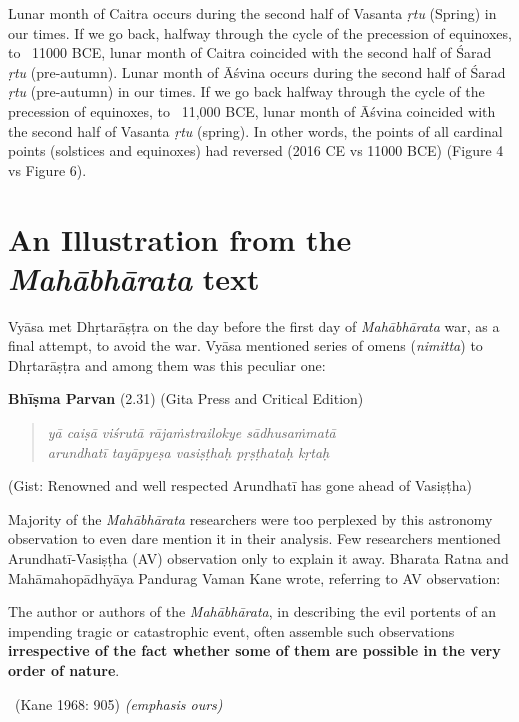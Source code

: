 \begin{enumerate}
Lunar month of Caitra occurs during the second half of Vasanta \textit{ṛtu} (Spring) in our times. If we go back, halfway through the cycle of the precession of equinoxes, to ~11000 BCE, lunar month of Caitra coincided with the second half of Śarad \textit{ṛtu} (pre-autumn). Lunar month of Āśvina occurs during the second half of Śarad \textit{ṛtu} (pre-autumn) in our times. If we go back halfway through the cycle of the precession of equinoxes, to ~11,000 BCE, lunar month of Āśvina coincided with the second half of Vasanta \textit{ṛtu} (spring). In other words, the points of all cardinal points (solstices and equinoxes) had reversed (2016 CE vs 11000 BCE) (Figure 4 vs Figure 6).

\end{enumerate}


\section*{An Illustration from the \textit{Mahābhārata} text}

Vyāsa met Dhṛtarāṣṭra on the day before the first day of \textit{Mahābhārata} war, as a final attempt, to avoid the war. Vyāsa mentioned series of omens (\textit{nimitta}) to Dhṛtarāṣṭra and among them was this peculiar one:

\textbf{Bhīṣma Parvan} (2.31) (Gita Press and Critical Edition)

\begin{verse}
\textit{yā caiṣā viśrutā rājaṁstrailokye sādhusaṁmatā }\\\textit{arundhatī tayāpyeṣa vasiṣṭhaḥ pṛṣṭhataḥ kṛtaḥ }
\end{verse}

\vspace{-.3cm}

(Gist: Renowned and well respected Arundhatī has gone ahead of Vasiṣṭha)

Majority of the \textit{Mahābhārata} researchers were too perplexed by this astronomy observation to even dare mention it in their analysis. Few researchers mentioned Arundhatī-Vasiṣṭha (AV) observation only to explain it away. Bharata Ratna and Mahāmahopādhyāya Pandurag Vaman Kane wrote, referring to AV observation:

\begin{myquote}
The author or authors of the \textit{Mahābhārata}, in describing the evil portents of an impending tragic or catastrophic event, often assemble such observations \textbf{irrespective of the fact whether some of them are possible in the very order of nature}. 

~\hfill (Kane 1968: 905) \textit{(emphasis ours)}
\end{myquote}

